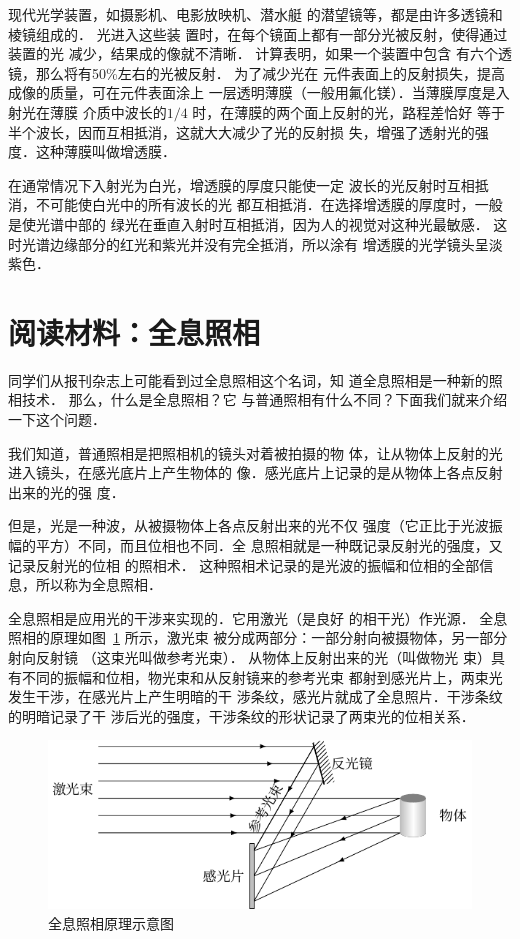 现代光学装置，如摄影机、电影放映机、潜水艇
的潜望镜等，都是由许多透镜和棱镜组成的．
光进入这些装
置时，在每个镜面上都有一部分光被反射，使得通过装置的光
减少，结果成的像就不清晰．
计算表明，如果一个装置中包含
有六个透镜，那么将有50\%左右的光被反射．
为了减少光在
元件表面上的反射损失，提高成像的质量，可在元件表面涂上
一层透明薄膜（一般用氟化镁）．当薄膜厚度是入射光在薄膜
介质中波长的$1/4$
时，在薄膜的两个面上反射的光，路程差恰好
等于半个波长，因而互相抵消，这就大大减少了光的反射损
失，增强了透射光的强度．这种薄膜叫做增透膜．

在通常情况下入射光为白光，增透膜的厚度只能使一定
波长的光反射时互相抵消，不可能使白光中的所有波长的光
都互相抵消．在选择增透膜的厚度时，一般是使光谱中部的
绿光在垂直入射时互相抵消，因为人的视觉对这种光最敏感．
这时光谱边缘部分的红光和紫光并没有完全抵消，所以涂有
增透膜的光学镜头呈淡紫色．

\section*{阅读材料：全息照相}
同学们从报刊杂志上可能看到过全息照相这个名词，知
道全息照相是一种新的照相技术．
那么，什么是全息照相？它
与普通照相有什么不同？下面我们就来介绍一下这个问题．

我们知道，普通照相是把照相机的镜头对着被拍摄的物
体，让从物体上反射的光进入镜头，在感光底片上产生物体的
像．感光底片上记录的是从物体上各点反射出来的光的强
度．

但是，光是一种波，从被摄物体上各点反射出来的光不仅
强度（它正比于光波振幅的平方）不同，而且位相也不同．全
息照相就是一种既记录反射光的强度，又记录反射光的位相
的照相术．
这种照相术记录的是光波的振幅和位相的全部信
息，所以称为全息照相．


全息照相是应用光的干涉来实现的．它用激光（是良好
的相干光）作光源．
全息照相的原理如图~\ref{fig_C_6-6} 所示，激光束
被分成两部分：一部分射向被摄物体，另一部分射向反射镜
（这束光叫做参考光束）．
从物体上反射出来的光（叫做物光
束）具有不同的振幅和位相，物光束和从反射镜来的参考光束
都射到感光片上，两束光发生干涉，在感光片上产生明暗的干
涉条纹，感光片就成了全息照片．干涉条纹的明暗记录了干
涉后光的强度，干涉条纹的形状记录了两束光的位相关系．
\begin{figure}[htbp]
	\centering
	\includegraphics{fig/C/6-6.pdf}
	\caption{全息照相原理示意图}\label{fig_C_6-6}
\end{figure}


